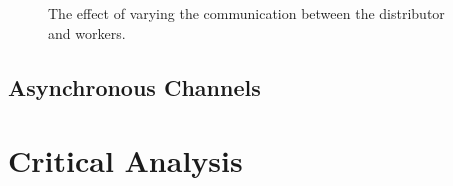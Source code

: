 \documentclass{article}
\begin{document}
    \begin{figure}[h]
        \begin{center}
            
            \caption{The effect of varying the communication between the distributor and workers.}
            \label{fig:hardsoftchannels}
        \end{center}
    \end{figure}

    \subsection{Asynchronous Channels} 
    \label{asyncchannels}

    \pagebreak

    \section{Critical Analysis} 
    \label{analysis}

\end{document}
